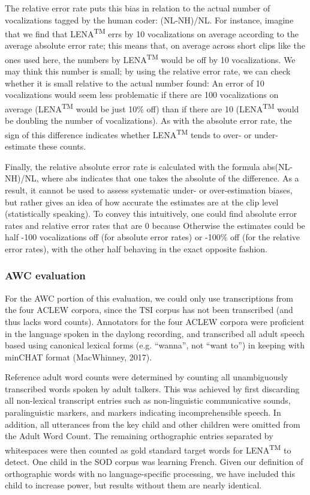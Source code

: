 \documentclass[english,table,man,floatsintext]{apa6}
\begin{document}
The relative error rate puts this bias in relation to the actual number of vocalizations tagged by the human coder: (NL-NH)/NL. For instance, imagine that we find that LENA\textsuperscript{TM} errs by 10 vocalizations on average according to the average absolute error rate; this means that, on average across short clips like the ones used here, the numbers by LENA\textsuperscript{TM} would be off by 10 vocalizations. We may think this number is small; by using the relative error rate, we can check whether it is small relative to the actual number found: An error of 10 vocalizations would seem less problematic if there are 100 vocalizations on average (LENA\textsuperscript{TM} would be just 10\% off) than if there are 10 (LENA\textsuperscript{TM} would be doubling the number of vocalizations). As with the absolute error rate, the sign of this difference indicates whether LENA\textsuperscript{TM} tends to over- or under-estimate these counts.

Finally, the relative absolute error rate is calculated with the formula abs(NL-NH)/NL, where abs indicates that one takes the absolute of the difference. As a result, it cannot be used to assess systematic under- or over-estimation biases, but rather gives an idea of how accurate the estimates are at the clip level (statistically speaking). To convey this intuitively, one could find absolute error rates and relative error rates that are 0 because Otherwise the estimates could be half -100 vocalizations off (for absolute error rates) or -100\% off (for the relative error rates), with the other half behaving in the exact opposite fashion.

\hypertarget{awc-evaluation}{%
\subsubsection{AWC evaluation}\label{awc-evaluation}}

For the AWC portion of this evaluation, we could only use transcriptions from the four ACLEW corpora, since the TSI corpus has not been transcribed (and thus lacks word counts). Annotators for the four ACLEW corpora were proficient in the language spoken in the daylong recording, and transcribed all adult speech based using canonical lexical forms (e.g. \enquote{wanna}, not \enquote{want to}) in keeping with minCHAT format (MacWhinney, 2017).

Reference adult word counts were determined by counting all unambiguously transcribed words spoken by adult talkers. This was achieved by first discarding all non-lexical transcript entries such as non-linguistic communicative sounds, paralinguistic markers, and markers indicating incomprehensible speech. In addition, all utterances from the key child and other children were omitted from the Adult Word Count. The remaining orthographic entries separated by whitespaces were then counted as gold standard target words for LENA\textsuperscript{TM} to detect. One child in the SOD corpus was learning French. Given our definition of orthographic words with no language-specific processing, we have included this child to increase power, but results without them are nearly identical.
\end{document}
